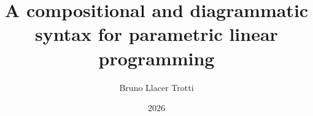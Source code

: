 \makeatletter

\newcommand{\nomeuniversidade}[1]{\gdef\@nomeuniversidade{#1}}
\newcommand{\nomeinstituto}[1]{\gdef\@nomeinstituto{#1}}
\newcommand{\nomeinstitutoparceiro}[1]{\gdef\@nomeinstitutoparceiro{#1}}
\newcommand{\nomeprograma}[1]{\gdef\@nomeprograma{#1}}
\newcommand{\siglaprograma}[1]{\gdef\@siglaprograma{#1}}
\newcommand{\subtitulo}[1]{\gdef\@subtitulo{#1}}
\newcommand{\cidade}[1]{\gdef\@cidade{#1}}
\newcommand{\orientador}[1]{\gdef\@orientador{#1}}
\newcommand{\coorientador}[1]{\gdef\@coorientador{#1}}
\newcommand{\orientadorestitulo}[1]{\gdef\@orientadorestitulo{#1}}
\newcommand{\textofolharosto}[1]{\gdef\@textofolharosto{#1}}
\newcommand{\siglauniversidade}[1]{\gdef\@siglauniversidade{#1}}

\nomeuniversidade{Universidade Federal do Rio de Janeiro}
\nomeinstituto{Instituto de Computação}
\nomeinstitutoparceiro{Instituto Tércio Pacitti de Aplicações e Pesquisas Computacionais}
\nomeprograma{Programa de Pós-Graduação em Informática}
\siglaprograma{PPGI}
\author{Bruno Llacer Trotti}
\title{A compositional and diagrammatic syntax for parametric linear programming}
\subtitulo{}
\cidade{Rio de Janeiro}
\date{2026}
\orientador{João Paixão}
\orientadorestitulo{D.Sc.}
\textofolharosto{Dissertação de Mestrado apresentada ao \@nomeprograma,
  \@nomeinstituto\ e \@nomeinstitutoparceiro, \@nomeuniversidade, como
  requisito parcial à obtenção do título de Mestre em Informática.}
\siglauniversidade{UFRJ}

\makeatother

